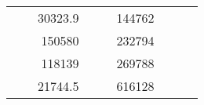 \begin{table}[]
\begin{tabular}{|ccrccrccc}
\multicolumn{1}{|c|}{\cellcolor[HTML]{FFFFC7}}                                & \multicolumn{1}{c|}{\cellcolor[HTML]{DDFDFF}}                      & \multicolumn{1}{r|}{\cellcolor[HTML]{DAE8FC}30323.9}   & \multicolumn{1}{c|}{\cellcolor[HTML]{FFFFC7}}                                & \multicolumn{1}{c|}{\cellcolor[HTML]{DDFDFF}}                       & \multicolumn{1}{r|}{\cellcolor[HTML]{DDFDFF}144762}    &                                                                              &                                                                    &                                                        \\ \cline{3-3} \cline{6-6}
\multicolumn{1}{|c|}{\cellcolor[HTML]{FFFFC7}}                                & \multicolumn{1}{c|}{\cellcolor[HTML]{DDFDFF}}                      & \multicolumn{1}{r|}{\cellcolor[HTML]{DDFDFF}150580}    & \multicolumn{1}{c|}{\cellcolor[HTML]{FFFFC7}}                                & \multicolumn{1}{c|}{\cellcolor[HTML]{DDFDFF}}                       & \multicolumn{1}{r|}{\cellcolor[HTML]{DAE8FC}232794}    &                                                                              &                                                                    &                                                        \\ \cline{3-3} \cline{6-6}
\multicolumn{1}{|c|}{\cellcolor[HTML]{FFFFC7}}                                & \multicolumn{1}{c|}{\cellcolor[HTML]{DDFDFF}}                      & \multicolumn{1}{r|}{\cellcolor[HTML]{DAE8FC}118139}    & \multicolumn{1}{c|}{\cellcolor[HTML]{FFFFC7}}                                & \multicolumn{1}{c|}{\cellcolor[HTML]{DDFDFF}}                       & \multicolumn{1}{r|}{\cellcolor[HTML]{DDFDFF}269788}    &                                                                              &                                                                    &                                                        \\ \cline{3-3} \cline{6-6}
\multicolumn{1}{|c|}{\cellcolor[HTML]{FFFFC7}}                                & \multicolumn{1}{c|}{\cellcolor[HTML]{DDFDFF}}                      & \multicolumn{1}{r|}{\cellcolor[HTML]{DDFDFF}21744.5}   & \multicolumn{1}{c|}{\cellcolor[HTML]{FFFFC7}}                                & \multicolumn{1}{c|}{\cellcolor[HTML]{DDFDFF}}                       & \multicolumn{1}{r|}{\cellcolor[HTML]{DAE8FC}616128}    &                                                                              &                                                                    &                                                        \\ \cline{3-3} \cline{6-6}

\end{tabular}
\end{table}
